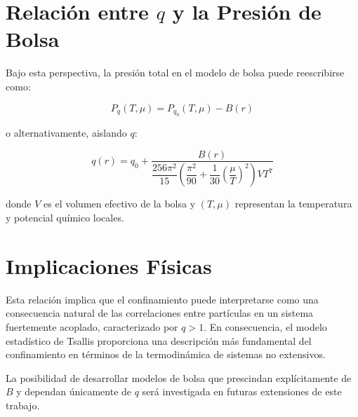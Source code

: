 \section{Relaci\'on entre \( q \) y la Presi\'on de Bolsa}
Bajo esta perspectiva, la presi\'on total en el modelo de bolsa puede reescribirse como:

\begin{equation}
P_q(T,\mu) = P_{q_0}(T,\mu) - B(r)
\end{equation}

o alternativamente, aislando \( q \):

\begin{equation}
q(r) = q_0 + \frac{B(r)}{\dfrac{256 \pi^2}{15} \left( \dfrac{\pi^2}{90} + \dfrac{1}{30} \left( \dfrac{\mu}{T} \right)^2 \right) V T^7}
\label{eq:q-bag-relation}
\end{equation}

donde \( V \) es el volumen efectivo de la bolsa y \( (T, \mu) \) representan la temperatura y potencial qu\'imico locales.

\section{Implicaciones F\'isicas}
Esta relaci\'on implica que el confinamiento puede interpretarse como una consecuencia natural de las correlaciones entre part\'iculas en un sistema fuertemente acoplado, caracterizado por \( q > 1 \). En consecuencia, el modelo estad\'istico de Tsallis proporciona una descripci\'on m\'as fundamental del confinamiento en t\'erminos de la termodin\'amica de sistemas no extensivos.

\begin{remark}
La posibilidad de desarrollar modelos de bolsa que prescindan expl\'icitamente de \( B \) y dependan \'unicamente de \( q \) ser\'a investigada en futuras extensiones de este trabajo.
\end{remark}
